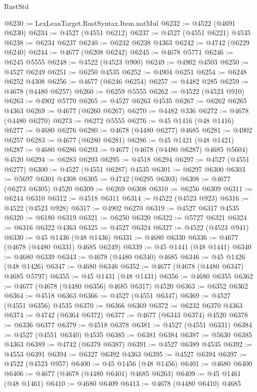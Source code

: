 \begin{lexlean}{RustStd}
\begin{coremodule}
@6230 := LexLeanTarget.RustSyntax.Item.natMul
@6232 := @4522 (@4691 @6230)
@6234 := @4527 (@4551 @6212)
@6237 := @4527 (@4551 @6221) @4535
@6238 := @6234 @6237
@6240 := @6232 @6238 @4363
@6242 := @4742 (@6229 @6240)
@6244 := @4677 (@6208 @6242)
@6245 := @4678 @5771
@6246 := @6245 @5555
@6248 := @4522 (@4523 @900)
@6249 := @4902 @4503
@6250 := @4527 @6249
@6251 := @6250 @4535
@6252 := @4904 @6251
@6254 := @6248 @6252 @4308
@6256 := @4677 (@6246 @6254)
@6257 := @4482 @285
@6259 := @4678 (@4480 @6257)
@6260 := @6259 @5555
@6262 := @4522 (@4523 @910)
@6263 := @4902 @5770
@6265 := @4527 @6263 @4535
@6267 := @6262 @6265 @4363
@6269 := @4677 (@6260 @6267)
@6270 := @4482 @336
@6272 := @4678 (@4480 @6270)
@6273 := @6272 @5555
@6276 := @45 @1416 (@48 @1416)
@6277 := @4680 @6276
@6280 := @4678 (@4480 @6277) @4685
@6281 := @4902 @6257
@6283 := @4677 (@6280 @6281)
@6286 := @45 @1421 (@48 @1421)
@6287 := @4680 @6286
@6293 := @4677 (@4678 (@4480 @6287) @4685 @5604) @4520
@6294 := @6283 @6293
@6295 := @4518 @6294
@6297 := @4527 (@4551 @6277)
@6300 := @4527 (@4551 @6287) @4535
@6301 := @6297 @6300
@6303 := @5697 @6301 @4308
@6305 := @4742 (@6295 @6303)
@6308 := @4677 (@6273 @6305) @4520
@6309 := @6269 @6308
@6310 := @6256 @6309
@6311 := @6244 @6310
@6312 := @4518 @6311
@6314 := @4522 (@4523 @923)
@6316 := @4522 (@4523 @928)
@6317 := @4902 @6270
@6319 := @4527 @6317 @4535
@6320 := @6180 @6319
@6321 := @6250 @6320
@6322 := @5727 @6321
@6324 := @6316 @6322 @4363
@6325 := @4527 @6324
@6327 := @4522 (@4523 @941)
@6330 := @45 @1436 (@48 @1436)
@6331 := @4680 @6330
@6336 := @4677 (@4678 (@4480 @6331) @4685 @6249)
@6339 := @45 @1441 (@48 @1441)
@6340 := @4680 @6339
@6343 := @4678 (@4480 @6340) @4685
@6346 := @45 @1426 (@48 @1426)
@6347 := @4680 @6346
@6352 := @4677 (@4678 (@4480 @6347) @4685 @5797)
@6355 := @45 @1431 (@48 @1431)
@6356 := @4680 @6355
@6362 := @4677 (@4678 (@4480 @6356) @4685 @6317) @4520
@6363 := @6352 @6362
@6364 := @4518 @6363
@6366 := @4527 (@4551 @6347)
@6369 := @4527 (@4551 @6356) @4535
@6370 := @6366 @6369
@6372 := @6232 @6370 @4363
@6374 := @4742 (@6364 @6372)
@6377 := @4677 (@6343 @6374) @4520
@6378 := @6336 @6377
@6379 := @4518 @6378
@6381 := @4527 (@4551 @6331)
@6384 := @4527 (@4551 @6340) @4535
@6385 := @6381 @6384
@6387 := @5630 @6385 @4363
@6389 := @4742 (@6379 @6387)
@6391 := @4527 @6389 @4535
@6392 := @4553 @6391
@6394 := @6327 @6392 @4363
@6395 := @4527 @6394
@6397 := @4522 (@4523 @957)
@6400 := @45 @1456 (@48 @1456)
@6401 := @4680 @6400
@6406 := @4677 (@4678 (@4480 @6401) @4685 @6263)
@6409 := @45 @1461 (@48 @1461)
@6410 := @4680 @6409
@6413 := @4678 (@4480 @6410) @4685

\end{coremodule}
\end{lexlean}

